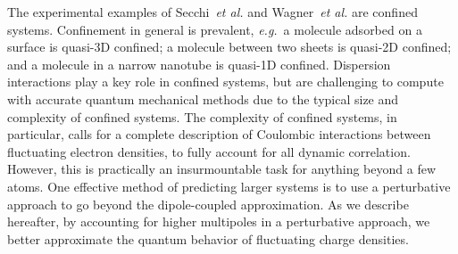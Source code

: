 \documentclass[aps,prl,groupaddress, twocolumn]{revtex4-1}  %
\begin{document}

The experimental examples of Secchi~\textit{et al.} and Wagner~\textit{et al.} are confined systems. Confinement in general is prevalent, \textit{e.g.}\ a molecule adsorbed on a surface is quasi-3D confined; a molecule between two sheets is quasi-2D confined; and a molecule in a narrow nanotube is quasi-1D confined. Dispersion interactions play a key role in confined systems, but are challenging to compute with accurate quantum mechanical methods due to the typical size and complexity of confined systems. The complexity of confined systems, in particular, calls for a complete description of Coulombic interactions between fluctuating electron densities, to fully account for all dynamic correlation. However, this is practically an insurmountable task for anything beyond a few atoms. One effective method of predicting larger systems is to use a perturbative approach to go beyond the dipole-coupled approximation. As we describe hereafter, by accounting for higher multipoles in a perturbative approach, we better approximate the quantum behavior of fluctuating charge densities.
\end{document}

